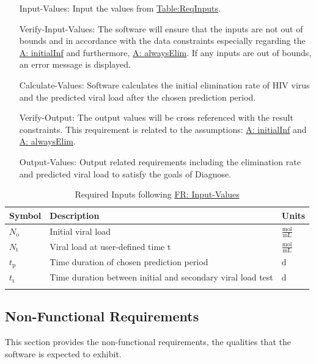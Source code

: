 \documentclass[12pt]{article}
\begin{document}
\begin{itemize}
\item[Input-Values:\phantomsection\label{inputValues}]{Input the values from \hyperref[Table:ReqInputs]{Table:ReqInputs}.}
\item[Verify-Input-Values:\phantomsection\label{verifyInput}]{The software will ensure that the inputs are not   out of bounds and in accordance with the data constraints especially regarding the \hyperref[initialInf]{A: initialInf} and furthermore, \hyperref[alwaysElim]{A: alwaysElim}. If any inputs are out of bounds, an error message is displayed.}
\item[Calculate-Values:\phantomsection\label{calcValues}]{Software calculates the initial elimination rate of HIV virus and the predicted viral load after the chosen prediction period.}
\item[Verify-Output:\phantomsection\label{verifyOutput}]{The output values will be cross referenced with  the result constraints. This requirement is related to the assumptions: \hyperref[initialInf]{A: initialInf} and \hyperref[alwaysElim]{A: alwaysElim}.}
\item[Output-Values:\phantomsection\label{outputValues}]{Output related requirements including the elimination rate and predicted viral load to satisfy the goals of Diagnose.}
\end{itemize}
\begin{longtabu}{l X[l] l}
\toprule
\textbf{Symbol} & \textbf{Description} & \textbf{Units}
\\
\midrule
\endhead
${N_{\text{o}}}$ & Initial viral load & $\frac{\text{mol}}{\text{mL}}$
\\
${N_{\text{t}}}$ & Viral load at user-defined time t & $\frac{\text{mol}}{\text{mL}}$
\\
${t_{\text{p}}}$ & Time duration of chosen prediction period & ${\text{d}}$
\\
${t_{\text{t}}}$ & Time duration between initial and secondary viral load test & ${\text{d}}$
\\
\bottomrule
\caption{Required Inputs following \hyperref[inputValues]{FR: Input-Values}}
\label{Table:ReqInputs}
\end{longtabu}
\subsection{Non-Functional Requirements}
\label{Sec:NFRs}
This section provides the non-functional requirements, the qualities that the software is expected to exhibit.
\end{document}
